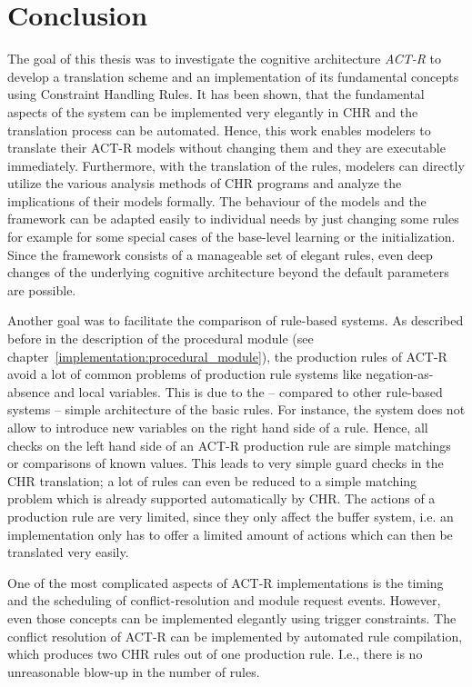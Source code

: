\chapter{Conclusion}
\label{conclusion}

The goal of this thesis was to investigate the cognitive architecture \emph{ACT-R} to develop a translation scheme and an implementation of its fundamental concepts using Constraint Handling Rules. It has been shown, that the fundamental aspects of the system can be implemented very elegantly in CHR and the translation process can be automated. Hence, this work enables modelers to translate their ACT-R models without changing them and they are executable immediately. Furthermore, with the translation of the rules, modelers can directly utilize the various analysis methods of CHR programs and analyze the implications of their models formally. The behaviour of the models and the framework can be adapted easily to individual needs by just changing some rules for example for some special cases of the base-level learning or the initialization. Since the framework consists of a manageable set of elegant rules, even deep changes of the underlying cognitive architecture beyond the default parameters are possible.

Another goal was to facilitate the comparison of rule-based systems. As described before in the description of the procedural module (see chapter~\ref{implementation:procedural_module}), the production rules of ACT-R avoid a lot of common problems of production rule systems like negation-as-absence and local variables. This is due to the -- compared to other rule-based systems -- simple architecture of the basic rules. For instance, the system does not allow to introduce new variables on the right hand side of a rule. Hence, all checks on the left hand side of an ACT-R production rule are simple matchings or comparisons of known values. This leads to very simple guard checks in the CHR translation; a lot of rules can even be reduced to a simple matching problem which is already supported automatically by CHR. The actions of a production rule are very limited, since they only affect the buffer system, i.e. an implementation only has to offer a limited amount of actions which can then be translated very easily.

One of the most complicated aspects of ACT-R implementations is the timing and the scheduling of conflict-resolution and module request events. However, even those concepts can be implemented elegantly using trigger constraints. The conflict resolution of ACT-R can be implemented by automated rule compilation, which produces two CHR rules out of one production rule. I.e., there is no unreasonable blow-up in the number of rules.

